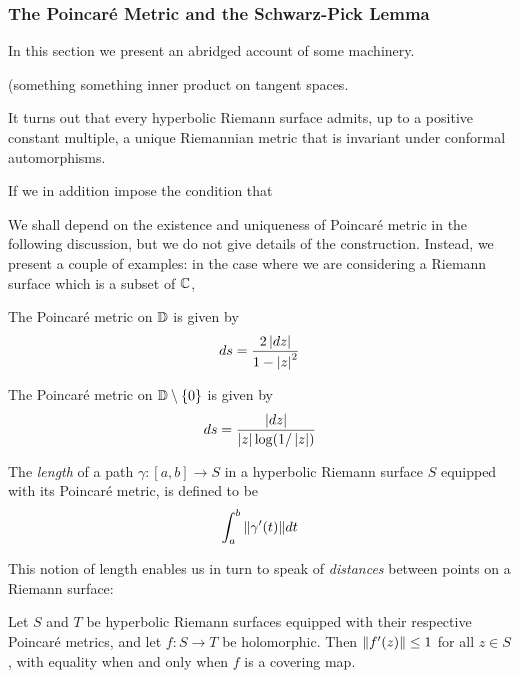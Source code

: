 \documentclass[../main.tex]{subfiles}
\newcommand\deriv[2]{{#1}'(#2)}
\begin{document}
\subsubsection{The Poincaré Metric and the Schwarz-Pick Lemma}

In this section we present an abridged account of some machinery.

\begin{dfn}
(something something inner product on tangent spaces.
\end{dfn}

It turns out that every hyperbolic Riemann surface admits, up to a positive constant multiple, a unique Riemannian metric that is invariant under conformal automorphisms.

If we in addition impose the condition that

We shall depend on the existence and uniqueness of Poincaré metric in the following discussion, but we do not give details of the construction. Instead, we present a couple of examples: in the case where we are considering a Riemann surface which is a subset of $\mathbb{C}$, 

\begin{exl}
The Poincaré metric on $\mathbb{D}$ is given by
\[
ds = \frac{2\left|dz\right|}{1-\left|z\right|^2}
\]
\end{exl}

\begin{exl}
The Poincaré metric on $\mathbb{D}\setminus \{0\}$ is given by
\[
ds = \frac{\left|dz\right|}{\left|z\right| \log(1/\left|z\right|)}
\]
\end{exl}



\begin{dfn}
The \emph{length} of a path $\gamma : [a, b] \to S$ in a hyperbolic Riemann surface $S$ equipped with its Poincaré metric, is defined to be
\[
\int_a^b \norm{\deriv{\gamma}{t}} dt
\]
\end{dfn}

This notion of length enables us in turn to speak of \emph{distances} between points on a Riemann surface:


\begin{lem}\label{11:lem:pre-schwarz-pick}
Let $S$ and $T$ be hyperbolic Riemann surfaces equipped with their respective Poincaré metrics, and let $f : S \to T$ be holomorphic. Then $\norm{\deriv{f}{z}} \le 1$ for all $z \in S$, with equality when and only when $f$ is a covering map.
\end{lem}
\end{document}
